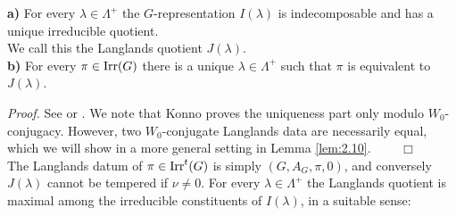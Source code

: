 \begin{thm}\label{thm:2.8}
\textup{\textbf{a)}} For every $\lambda \in \Lambda^+$ the $G$-representation
$I (\lambda)$ is indecomposable and has a unique irreducible quotient.\\
We call this the Langlands quotient $J (\lambda )$.\\
\textup{\textbf{b)}} For every $\pi \in \mathrm{Irr}(G)$ there is a unique
$\lambda \in \Lambda^+$ such that $\pi$ is equivalent to $J (\lambda )$.
\end{thm}
\emph{Proof.} See \cite{Kon} or \cite[\S XI.2]{BoWa}. We note that Konno proves
the uniqueness part only modulo $W_0$-conjugacy. However, two $W_0$-conjugate
Langlands data are necessarily equal, which we will show in a more general setting
in Lemma \ref{lem:2.10}. $\qquad \Box$ 
\\[3mm]

The Langlands datum of $\pi \in \mathrm{Irr}^t (G)$ is simply $(G,A_G ,\pi ,0)$, and conversely
$J(\lambda )$ cannot be tempered if $\nu \neq 0$. For every $\lambda \in \Lambda^+$
the Langlands quotient is maximal among the irreducible constituents of $I(\lambda )$,
in a suitable sense:

